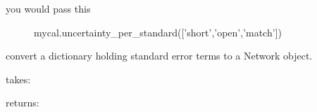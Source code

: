 \documentclass[letterpaper,10pt,english]{sphinxmanual}
\begin{document}
\begin{fulllineitems}
\begin{fulllineitems}
\begin{description}
\begin{description}
\item[{you would pass this}] \leavevmode
mycal.uncertainty\_per\_standard({[}'short','open','match'{]})

\end{description}

\end{description}

\end{fulllineitems}


\end{fulllineitems}


\begin{fulllineitems}
\label{api/mwavepy.calibration:mwavepy.calibration.calibration.error_dict_2_network}
convert a dictionary holding standard error terms to a Network
object.

takes:

returns:

\end{fulllineitems}

\end{document}
